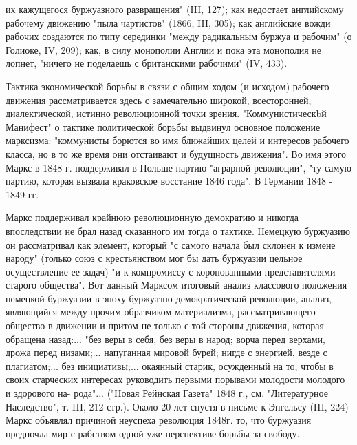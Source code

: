 \documentclass[12pt]{article}
\newcommand{\parnum}{(\arabic{parcount})}
\newcounter{parcount}
\newenvironment{parnumbers}{%
  \par%
  \everypar{\noindent \stepcounter{parcount}\marginpar[]{\parnum}}%
}{}
\begin{document}
\begin{parnumbers}
их кажущегося буржуазного развращения" (III, 127); как недостает английскому рабочему движению "пыла чартистов" (1866; III, 305); как английские вожди рабочих создаются по типу серединки "между радикальным буржуа и рабочим" (о Голиоке, IV, 209); как, в силу монополии Англии и пока эта монополия не лопнет, "ничего не поделаешь с британскими рабочими" (IV, 433).

    Тактика экономической борьбы в связи с общим ходом (и исходом) рабочего движения рассматривается здесь с замечательно широкой, всесторонней, диалектической, истинно революционной точки зрения. "Коммунистическbй Манифест" о тактике политической борьбы выдвинул основное положение марксизма: "коммунисты борются во имя ближайших целей и интересов рабочего класса, но в то же время они отстаивают и будущность движения". Во имя этого Маркс в 1848 г. поддерживал в Польше партию "аграрной революции", "ту самую партию, которая вызвала краковское восстание 1846 года". В Германии 1848 - 1849 гг.

    Маркс поддерживал крайнюю революционную демократию и никогда впоследствии не брал назад сказанного им тогда о тактике. Немецкую буржуазию он рассматривал как элемент, который "с самого начала был склонен к измене народу" (только союз с крестьянством мог бы дать буржуазии цельное осуществление ее задач) "и к компромиссу с коронованными представителями старого общества". Вот данный Марксом итоговый анализ классового положения немецкой буржуазии в эпоху буржуазно-демократической революции, анализ, являющийся между прочим образчиком материализма, рассматривающего общество в движении и притом не только с той стороны движения, которая обращена назад:... "без веры в себя, без веры в народ; ворча перед верхами, дрожа перед низами;... напуганная мировой бурей; нигде с энергией, везде с плагиатом;... без инициативы;... окаянный старик, осужденный на то, чтобы в своих старческих интересах руководить первыми порывами молодости молодого и здорового на- рода"... ("Новая Рейнская Газета" 1848 г., см. "Литературное Наследство", т. III, 212 стр.). Около 20 лет спустя в письме к Энгельсу (III, 224) Маркс объявлял причиной неуспеха революция 1848г. то, что буржуазия предпочла мир с рабством одной уже перспективе борьбы за свободу.


\end{parnumbers}
\end{document}
